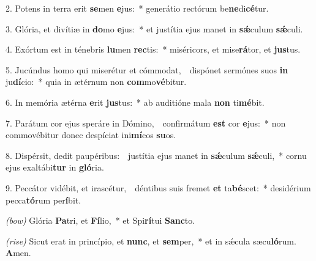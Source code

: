 2. Potens in terra erit \textbf{se}men \textbf{e}jus:~*
	generátio rectórum be\textbf{ne}di\textbf{cé}tur.

3. Glória, et divítiæ in \textbf{do}mo \textbf{e}jus:~*
	et justítia ejus manet in \textbf{s\'{\ae}}culum \textbf{s\'{\ae}}culi.

4. Exórtum est in ténebris \textbf{lu}men \textbf{rec}tis:~*
	miséricors, et mise\textbf{rá}tor, et \textbf{jus}tus.

5. Jucúndus homo qui miserétur et cómmodat,~\GreDagger\
	dispónet sermónes suos \textbf{in} ju\textbf{dí}cio:~*
	quia in ætérnum non \textbf{com}mo\textbf{vé}bitur.

6. In memória ætérna \textbf{e}rit \textbf{jus}tus:~*
	ab auditióne mala \textbf{non} ti\textbf{mé}bit.

7. Parátum cor ejus speráre in Dómino,~\GreDagger\
	confirmátum \textbf{est} cor \textbf{e}jus:~*
	non commovébitur donec despíciat ini\textbf{mí}cos \textbf{su}os.

8. Dispérsit, dedit paupéribus:~\GreDagger\
	justítia ejus manet in \textbf{s\'{\ae}}culum \textbf{s\'{\ae}}\-culi,~*
	cornu ejus exaltábi\textbf{tur} in \textbf{gló}ria.

9. Peccátor vidébit, et irascétur,~\GreDagger\
	déntibus suis fremet \textbf{et} ta\textbf{bé}scet:~*
	desidérium pecca\textbf{tó}rum per\textbf{í}bit.

\textit{(bow)} Glória \textbf{Pa}tri, et \textbf{Fí}lio,~*
	et Spi\textbf{rí}tui \textbf{Sanc}to.

\textit{(rise)} Sicut erat in princípio, et \textbf{nunc}, et \textbf{sem}per,~*
	et in s\'{\ae}cula sæcu\textbf{ló}rum. \textbf{A}men.